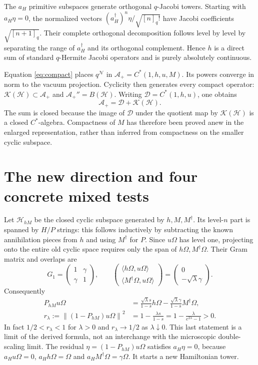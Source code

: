 \documentclass[11pt]{article}
\newcommand{\HH}{\mathcal H}
\newcommand{\Alg}{\mathcal A}
\newcommand{\K}{\mathcal K(\HH)}
\newcommand{\norm}[1]{\left\lVert#1\right\rVert}
\newcommand{\NN}{\mathcal N}
\begin{document}
The $a_H$ primitive subspaces generate orthogonal $q$-Jacobi towers.
Starting with $a_H\eta=0$, the normalized vectors
$(a_H^\dagger)^n\eta/\sqrt{[n]_q!}$ have Jacobi coefficients
$\sqrt{[n+1]_q}$. Their complete orthogonal decomposition follows
level by level by separating the range of $a_H^\dagger$ and its
orthogonal complement. Hence $h$ is a direct sum of standard
$q$-Hermite Jacobi operators and is purely absolutely continuous.

Equation \eqref{eq:compact} places $q^{\NN}$ in
$\Alg_+=C^*(1,h,u,M)$. Its powers converge in norm to the vacuum
projection. Cyclicity then generates every compact operator:
$\K\subset\Alg_+$ and $\Alg_+''=B(\HH)$. Writing
$\mathcal D=C^*(1,h,u)$, one obtains
\begin{equation}\label{eq:sum}
 \Alg_+=\mathcal D+\K.
\end{equation}
The sum is closed because the image of $\mathcal D$ under the quotient
map by $\K$ is a closed $C^*$-algebra. Compactness of $M$ has therefore
been proved anew in the enlarged representation, rather than inferred
from compactness on the smaller cyclic subspace.

\newpage
\section{The new direction and four concrete mixed tests}
Let $\HH_{hM}$ be the closed cyclic subspace generated by $h,M,M^\dagger$.
Its level-$n$ part is spanned by $H/P$ strings: this follows
inductively by subtracting the known annihilation pieces from $h$ and
using $M^\dagger$ for $P$. Since $u\Omega$ has level one, projecting
onto the entire old cyclic space requires only the span of
$h\Omega,M^\dagger\Omega$. Their Gram matrix and overlaps are
\begin{equation}
 G_1=\begin{pmatrix}1&\gamma\\\gamma&1\end{pmatrix},
 \qquad
 \begin{pmatrix}\langle h\Omega,u\Omega\rangle\\
 \langle M^\dagger\Omega,u\Omega\rangle\end{pmatrix}
 =\begin{pmatrix}0\\-\sqrt\lambda\gamma\end{pmatrix}.
\end{equation}
Consequently
\begin{align}
 P_{hM}u\Omega&=\frac{\sqrt\lambda s}{1-s}h\Omega
       -\frac{\sqrt\lambda\gamma}{1-s}M^\dagger\Omega,\\
 r_\lambda:=\norm{(1-P_{hM})u\Omega}^2
 &=1-\frac{\lambda s}{1-s}
   =1-\frac{\lambda}{e^{2\lambda}-1}>0.\label{eq:residual}
\end{align}
In fact $1/2<r_\lambda<1$ for $\lambda>0$ and
$r_\lambda\to1/2$ as $\lambda\downarrow0$. This last statement is a
limit of the derived formula, not an interchange with the microscopic
double-scaling limit. The residual $\eta=(1-P_{hM})u\Omega$ satisfies
$a_H\eta=0$, because $a_Hu\Omega=0$, $a_Hh\Omega=\Omega$ and
$a_HM^\dagger\Omega=\gamma\Omega$. It starts a new Hamiltonian tower.
\end{document}
